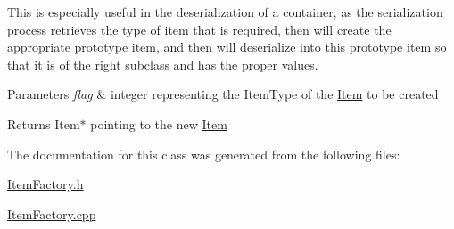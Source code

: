 This is especially useful in the deserialization of a container, as the serialization process retrieves the type of item that is required, then will create the appropriate prototype item, and then will deserialize into this prototype item so that it is of the right subclass and has the proper values. 
\begin{DoxyParams}{Parameters}
{\em flag} & integer representing the Item\+Type of the \hyperlink{class_item}{Item} to be created \\
\hline
\end{DoxyParams}
\begin{DoxyReturn}{Returns}
Item$\ast$ pointing to the new \hyperlink{class_item}{Item} 
\end{DoxyReturn}


The documentation for this class was generated from the following files\+:\begin{DoxyCompactItemize}
\item 
\hyperlink{_item_factory_8h}{Item\+Factory.\+h}\item 
\hyperlink{_item_factory_8cpp}{Item\+Factory.\+cpp}\end{DoxyCompactItemize}

